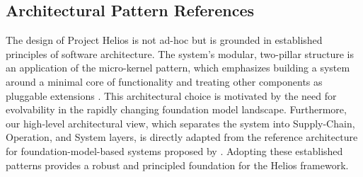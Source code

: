 \documentclass{article}
\begin{document}
\subsection{Architectural Pattern References}
The design of Project Helios is not ad-hoc but is grounded in established principles of software architecture. The system's modular, two-pillar structure is an application of the micro-kernel pattern, which emphasizes building a system around a minimal core of functionality and treating other components as pluggable extensions \citep{inbook}. This architectural choice is motivated by the need for evolvability in the rapidly changing foundation model landscape. Furthermore, our high-level architectural view, which separates the system into Supply-Chain, Operation, and System layers, is directly adapted from the reference architecture for foundation-model-based systems proposed by \citep{lu2024referencearchitecturedesigningfoundation}. Adopting these established patterns provides a robust and principled foundation for the Helios framework.
\end{document}
